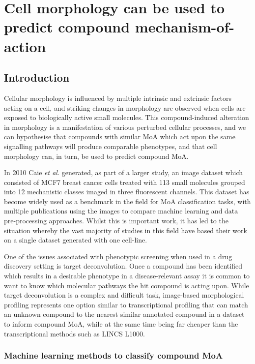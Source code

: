 \documentclass[a4paper,11pt,twoside,openright]{scrbook}
\begin{document}
\chapter{Cell morphology can be used to predict compound mechanism-of-action} \label{chapter:moa}


\section{Introduction}

Cellular morphology is influenced by multiple intrinsic and extrinsic factors acting on a cell, and striking changes in 
morphology are observed when cells are exposed to biologically active small molecules.
This compound-induced alteration in morphology is a manifestation of various perturbed cellular processes, and we can 
hypothesise that compounds with similar MoA which act upon the same signalling pathways will produce comparable 
phenotypes, and that cell morphology can, in turn, be used to predict compound MoA.

In 2010 Caie \textit{et al.} generated, as part of a larger study, an image dataset which consisted of MCF7 breast 
cancer cells treated with 113 small molecules grouped into 12 mechanistic classes imaged in three fluorescent 
channels.\cite{Caie2010}
This dataset has become widely used as a benchmark in the field for MoA classification tasks, with multiple 
publications using the images to compare machine learning and data pre-processing approaches. 
\cite{Ljosa2013a,Singh2014a,Pawlowski2016,Ando2017}
Whilst this is important work, it has led to the situation whereby the vast majority of studies in this field have 
based their work on a single dataset generated with one cell-line.

One of the issues associated with phenotypic screening when used in a drug discovery setting is target deconvolution.
Once a compound has been identified which results in a desirable phenotype in a disease-relevant assay it is common to 
want to know which molecular pathways the hit compound is acting upon.
While target deconvolution is a complex and difficult task, image-based morphological profiling represents one option 
similar to transcriptional profiling that can match an unknown compound to the nearest similar annotated compound in a 
dataset to inform compound MoA, while at the same time being far cheaper than the transcriptional methods such as LINCS 
L1000. \cite{Duan2014}


\subsection{Machine learning methods to classify compound MoA}
\end{document}

